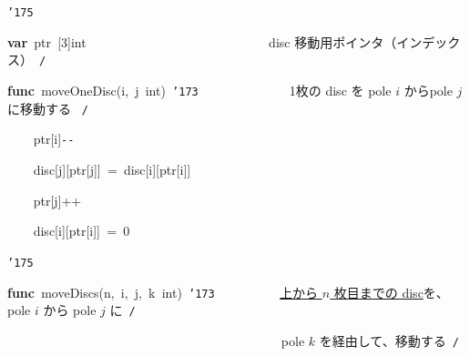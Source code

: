 \documentclass[a4paper,10pt]{article}
\def\mc{\relax}
\begin{document}
\noindent
\mbox{}{\tt\char'175}

\noindent
\mbox{}\hfill

\noindent
\mbox{}\textbf{var}{\tt\mc \ }ptr{\tt\mc \ }[3]int{\tt\mc \ }{\tt\mc \ }{\tt\mc \ }{\tt\mc \ }{\tt\mc \ }{\tt\mc \ }{\tt\mc \ }{\tt\mc \ }{\tt\mc \ }{\tt\mc \ }{\tt\mc \ }{\tt\mc \ }{\tt\mc \ }{\tt\mc \ }{\tt\mc \ }{\tt\mc \ }{\tt\mc \ }{\tt\mc \ }{\tt\mc \ }{\tt\mc \ }{\tt\mc \ }{\tt\mc \ }{\tt\mc \ }{\tt\mc \ }{\tt\mc \ }{\tt\mc \ }\rm\mc {\tt /}{\tt *}\  \ disc 移動用ポインタ（インデックス）\hfill \rm\mc \ {\tt *}{\tt /}
\tt\mc 

\noindent
\mbox{}\hfill

\noindent
\mbox{}\textbf{func}{\tt\mc \ }moveOneDisc(i,{\tt\mc \ }j{\tt\mc \ }int){\tt\mc \ }{\tt\char'173}{\tt\mc \ }{\tt\mc \ }{\tt\mc \ }{\tt\mc \ }{\tt\mc \ }{\tt\mc \ }{\tt\mc \ }{\tt\mc \ }{\tt\mc \ }{\tt\mc \ }{\tt\mc \ }{\tt\mc \ }\rm\mc {\tt /}{\tt *}\  \ 1枚の disc を pole $i$ からpole $j$ に移動する \hfill \rm\mc \ {\tt *}{\tt /}
\tt\mc 

\noindent
\mbox{}{\tt\mc \ }{\tt\mc \ }{\tt\mc \ }{\tt\mc \ }ptr[i]{\tt -}{\tt -}

\noindent
\mbox{}{\tt\mc \ }{\tt\mc \ }{\tt\mc \ }{\tt\mc \ }disc[j][ptr[j]]{\tt\mc \ }={\tt\mc \ }disc[i][ptr[i]]

\noindent
\mbox{}{\tt\mc \ }{\tt\mc \ }{\tt\mc \ }{\tt\mc \ }ptr[j]++

\noindent
\mbox{}{\tt\mc \ }{\tt\mc \ }{\tt\mc \ }{\tt\mc \ }disc[i][ptr[i]]{\tt\mc \ }={\tt\mc \ }0

\noindent
\mbox{}{\tt\char'175}

\noindent
\mbox{}\hfill

\noindent
\mbox{}\textbf{func}{\tt\mc \ }moveDiscs(n,{\tt\mc \ }i,{\tt\mc \ }j,{\tt\mc \ }k{\tt\mc \ }int){\tt\mc \ }{\tt\char'173}{\tt\mc \ }{\tt\mc \ }{\tt\mc \ }{\tt\mc \ }{\tt\mc \ }{\tt\mc \ }{\tt\mc \ }{\tt\mc \ }\rm\mc {\tt /}{\tt *}\  \ \underline{\textsf{上から $n$ 枚目までの disc}}を、pole $i$ から pole $j$ に\hfill \rm\mc \ {\tt *}{\tt /}
\tt\mc 

\noindent
\mbox{}{\tt\mc \ }{\tt\mc \ }{\tt\mc \ }{\tt\mc \ }{\tt\mc \ }{\tt\mc \ }{\tt\mc \ }{\tt\mc \ }{\tt\mc \ }{\tt\mc \ }{\tt\mc \ }{\tt\mc \ }{\tt\mc \ }{\tt\mc \ }{\tt\mc \ }{\tt\mc \ }{\tt\mc \ }{\tt\mc \ }{\tt\mc \ }{\tt\mc \ }{\tt\mc \ }{\tt\mc \ }{\tt\mc \ }{\tt\mc \ }{\tt\mc \ }{\tt\mc \ }{\tt\mc \ }{\tt\mc \ }{\tt\mc \ }{\tt\mc \ }{\tt\mc \ }{\tt\mc \ }{\tt\mc \ }{\tt\mc \ }{\tt\mc \ }{\tt\mc \ }{\tt\mc \ }{\tt\mc \ }{\tt\mc \ }{\tt\mc \ }\rm\mc {\tt /}{\tt *}\  \ pole $k$ を経由して、移動する\hfill \rm\mc \ {\tt *}{\tt /}
\tt\mc 
\end{document}
